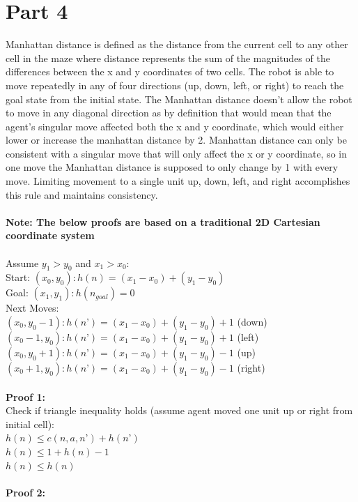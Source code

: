 \documentclass[12pt, letterpaper]{article}
\begin{document}
\pagebreak
\section*{Part 4}
Manhattan distance is defined as the distance from the current cell to any other cell in the maze where distance represents the sum of the magnitudes of the differences between the x and y coordinates of two cells. The robot is able to move repeatedly in any of four directions (up, down, left, or right) to reach the goal state from the initial state. The Manhattan distance doesn’t allow the robot to move in any diagonal direction as by definition that would mean that the agent’s singular move affected both the x and y coordinate, which would either lower or increase the manhattan distance by 2. Manhattan distance can only be consistent with a singular move that will only affect the x or y coordinate, so in one move the Manhattan distance is supposed to only change by 1 with every move. Limiting movement to a single unit up, down, left, and right accomplishes this rule and maintains consistency.
\\~\\
\textbf{Note: The below proofs are based on a traditional 2D Cartesian coordinate system}
\\~\\
Assume \(y_1  > y_0\) and \(x_1 > x_0:\)
\\Start: \((x_0, y_0): h(n) =  (x_1 - x_0) + (y_1 - y_0)\)          
\\Goal: \((x_1, y_1): h(n_{goal}) = 0\)
\\Next Moves:
\\\((x_0, y_0 - 1): 	h(n’) = (x_1 - x_0) + (y_1 - y_0)  + 1\) \quad(down)
\\\((x_0 - 1, y_0): 	h(n’) = (x_1 - x_0) + (y_1 - y_0)  + 1\) \quad(left)
\\\((x_0, y_0 + 1): 	h(n’) = (x_1 - x_0) + (y_1 - y_0)  - 1\)	 \quad(up)
\\\((x_0 + 1, y_0): 	h(n’) = (x_1 - x_0) + (y_1 - y_0)  - 1\)	 \quad(right)
\\
\\\textbf{Proof 1:}
\\Check if triangle inequality holds (assume agent moved one unit up or right from initial cell):
\\
\(h(n) \le c(n, a, n’) + h(n’)\)
\\
\(h(n) \le 1 + h(n) - 1\)
\\
\(h(n) \le h(n)\)
\\
\\\textbf{Proof 2:}
\end{document}
